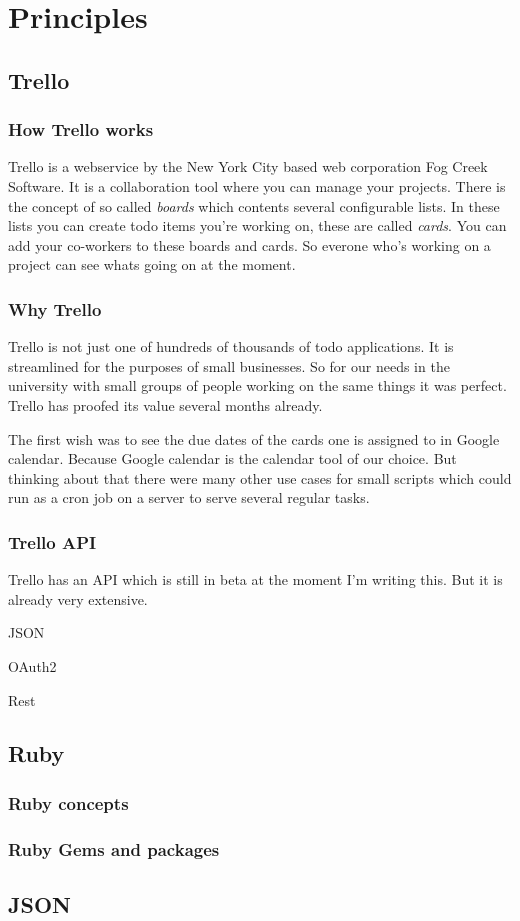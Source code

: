 
\chapter{Principles}
  \label{Principles}

\section{Trello}

\subsection{How Trello works}
Trello is a webservice by the New York City based web corporation Fog Creek Software. It is a collaboration tool where you can manage your projects. There is the concept of so called \emph{boards} which contents several configurable lists. In these lists you can create todo items you're working on, these are called \emph{cards}. You can add your co-workers to these boards and cards. So everone who's working on a project can see whats going on at the moment.

\subsection{Why Trello}
Trello is not just one of hundreds of thousands of todo applications. It is streamlined for the purposes of small businesses. So for our needs in the university with small groups of people working on the same things it was perfect. Trello has proofed its value several months already.

The first wish was to see the due dates of the cards one is assigned to in Google calendar. Because Google calendar is the calendar tool of our choice. But thinking about that there were many other use cases for small scripts which could run as a cron job on a server to serve several regular tasks.

\subsection{Trello API}
Trello has an API which is still in beta at the moment I'm writing this. But it is already very extensive. 

JSON

OAuth2

Rest

\section{Ruby}

\subsection{Ruby concepts}

\subsection{Ruby Gems and packages}

\section{JSON}